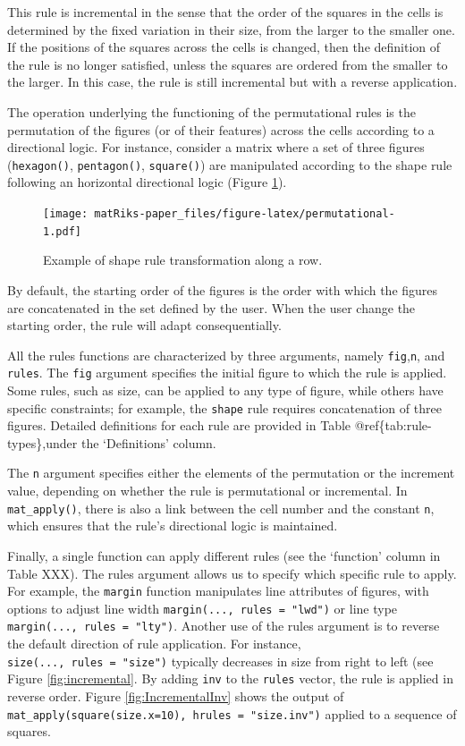 This rule is incremental in the sense that the order of the squares in the cells is determined by the fixed variation in their size, from the larger to the smaller one. If the positions of the squares across the cells is changed, then the definition of the rule is no longer satisfied, unless the squares are ordered from the smaller to the larger. In this case, the rule is still incremental but with a reverse application.

The operation underlying the functioning of the permutational rules is the permutation of the figures (or of their features) across the cells according to a directional logic.
For instance, consider a matrix where a set of three figures (\texttt{hexagon()}, \texttt{pentagon()}, \texttt{square()}) are manipulated according to the shape rule following an horizontal directional logic (Figure \ref{fig:permutational}).

\begin{figure}
\centering
\texttt{[image: matRiks-paper\_files/figure-latex/permutational-1.pdf]}
\caption{\label{fig:permutational}Example of shape rule transformation along a row.}
\end{figure}

By default, the starting order of the figures is the order with which the figures are concatenated in the set defined by the user. When the user change the starting order, the rule will adapt consequentially.

All the rules functions are characterized by three arguments, namely \texttt{fig},\texttt{n}, and \texttt{rules}.
The \texttt{fig} argument specifies the initial figure to which the rule is applied. Some rules, such as size, can be applied to any type of figure, while others have specific constraints; for example, the \texttt{shape} rule requires concatenation of three figures. Detailed definitions for each rule are provided in Table @ref\{tab:rule-types\},under the `Definitions' column.

The \texttt{n} argument specifies either the elements of the permutation or the increment value, depending on whether the rule is permutational or incremental. In \texttt{mat\_apply()}, there is also a link between the cell number and the constant \texttt{n}, which ensures that the rule's directional logic is maintained.

Finally, a single function can apply different rules (see the `function' column in Table XXX). The rules argument allows us to specify which specific rule to apply. For example, the \texttt{margin} function manipulates line attributes of figures, with options to adjust line width \texttt{margin(...,\ rules\ =\ "lwd")} or line type \texttt{margin(...,\ rules\ =\ "lty")}. Another use of the rules argument is to reverse the default direction of rule application. For instance, \texttt{size(...,\ rules\ =\ "size")} typically decreases in size from right to left (see Figure \ref{fig:incremental}. By adding \texttt{inv} to the \texttt{rules} vector, the rule is applied in reverse order. Figure \ref{fig:IncrementalInv} shows the output of \texttt{mat\_apply(square(size.x=10),\ hrules\ =\ "size.inv")} applied to a sequence of squares.

